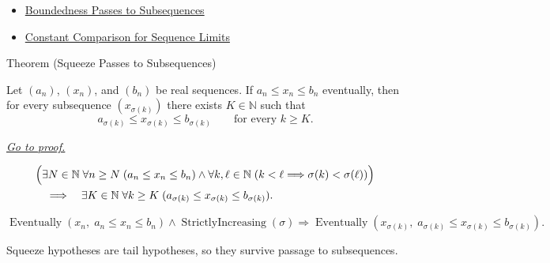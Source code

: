 \begin{dependencies}
\begin{itemize}
  \item \hyperref[thm:boundedness-passes-to-subsequences]{Boundedness Passes to Subsequences}
  \item \hyperref[thm:constant-comparison-for-sequence-limits]{Constant Comparison for Sequence Limits}
\end{itemize}
\end{dependencies}


\begin{theorembox}{Theorem (Squeeze Passes to Subsequences)}
\begin{theorem}
\label{thm:squeeze-passes-to-subsequences}
Let $(a_n)$, $(x_n)$, and $(b_n)$ be real sequences. If
$a_n\le x_n\le b_n$ eventually, then for every subsequence
$(x_{\sigma(k)})$ there exists $K\in\mathbb{N}$ such that
\[
  a_{\sigma(k)}\le x_{\sigma(k)}\le b_{\sigma(k)}
  \qquad
  \text{for every } k\ge K.
\]

\smallskip
\noindent
\hyperref[prf:squeeze-passes-to-subsequences]{\textit{Go to proof.}}
\end{theorem}
\end{theorembox}

\begin{remark*}
\[
\begin{aligned}
&\Bigl(
  \exists N\in\mathbb{N}\;\forall n\ge N\;(a_n\le x_n\le b_n)
  \land
  \forall k,\ell\in\mathbb{N}\;(k<\ell\Longrightarrow\sigma(k)<\sigma(\ell))
\Bigr)\\
&\quad\Longrightarrow\quad
\exists K\in\mathbb{N}\;\forall k\ge K\;
(a_{\sigma(k)}\le x_{\sigma(k)}\le b_{\sigma(k)}).
\end{aligned}
\]
\end{remark*}

\begin{remark*}
\[
\operatorname{Eventually}(x_n,\;a_n\le x_n\le b_n)
\land
\operatorname{StrictlyIncreasing}(\sigma)
\Longrightarrow
\operatorname{Eventually}(x_{\sigma(k)},\;a_{\sigma(k)}\le x_{\sigma(k)}\le b_{\sigma(k)}).
\]
\end{remark*}

\begin{remark*}[Interpretation]
Squeeze hypotheses are tail hypotheses, so they survive passage to
subsequences.
\end{remark*}

